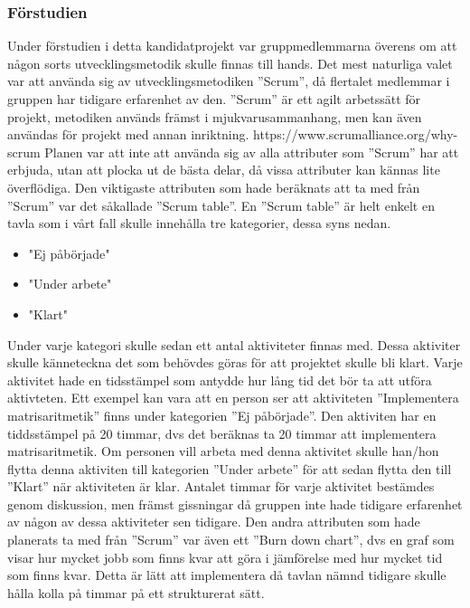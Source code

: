 \subsubsection{Förstudien}
Under förstudien i detta kandidatprojekt var gruppmedlemmarna överens om att någon sorts utvecklingsmetodik skulle finnas till hands. Det mest naturliga valet var att använda sig av utvecklingsmetodiken ''Scrum'', då flertalet medlemmar i gruppen har tidigare erfarenhet av den. ''Scrum'' är ett agilt arbetssätt för projekt, metodiken används främst i mjukvarusammanhang, men kan även användas för projekt med annan inriktning. https://www.scrumalliance.org/why-scrum
\newline
\newline
Planen var att inte att använda sig av alla attributer som ''Scrum'' har att erbjuda, utan att plocka ut de bästa delar, då vissa attributer kan kännas lite överflödiga. Den viktigaste attributen som hade beräknats att ta med från ''Scrum'' var det såkallade ''Scrum table''. En ''Scrum table'' är helt enkelt en tavla som i vårt fall skulle innehålla tre kategorier, dessa syns nedan.
\begin{itemize}
  \item "Ej påbörjade"
  \item "Under arbete"
  \item "Klart"
\end{itemize}
Under varje kategori skulle sedan ett antal aktiviteter finnas med. Dessa aktiviter skulle känneteckna det som behövdes göras för att projektet skulle bli klart. Varje aktivitet hade en tidsstämpel som antydde hur lång tid det bör ta att utföra aktivteten. Ett exempel kan vara att en person ser att aktiviteten ''Implementera matrisaritmetik'' finns under kategorien ''Ej påbörjade''. Den aktiviten har en tiddsstämpel på 20 timmar, dvs det beräknas ta 20 timmar att implementera matrisaritmetik. Om personen vill arbeta med denna aktivitet skulle han/hon flytta denna aktiviten till kategorien ''Under arbete'' för att sedan flytta den till ''Klart'' när aktiviteten är klar. Antalet timmar för varje aktivitet bestämdes genom diskussion, men främst gissningar då gruppen inte hade tidigare erfarenhet av någon av dessa aktiviteter sen tidigare.
\newline
\newline
Den andra attributen som hade planerats ta med från ''Scrum'' var även ett ''Burn down chart'', dvs en graf som visar hur mycket jobb som finns kvar att göra i jämförelse med hur mycket tid som finns kvar. Detta är lätt att implementera då tavlan nämnd tidigare skulle hålla kolla på timmar på ett strukturerat sätt. 
